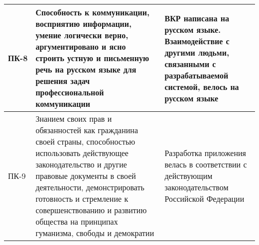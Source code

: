 \documentclass[a4paper,article]{article}
\begin{document}
\begin{sloppypar}
\begin{xltabular}{\textwidth} { |
                >{\hsize} X |
                >{\hsize} X |
                >{\hsize} X | }
            \hline
            ПК-8
            & Способность к коммуникации, восприятию информации, умение логически верно, аргументировано и ясно строить устную и письменную речь на русском языке для решения задач профессиональной коммуникации
            & ВКР написана на русском языке. Взаимодействие с другими людьми, связанными с разрабатываемой системой, велось на русском языке \\
            \hline
            ПК-9
            & Знанием своих прав и обязанностей как гражданина своей страны, способностью использовать действующее законодательство и другие правовые документы в своей деятельности, демонстрировать готовность и стремление к совершенствованию и развитию общества на принципах гуманизма, свободы и демократии
            & Разработка приложения велась в соответствии с действующим законодательством Российской Федерации \\
            \hline
        \end{xltabular}
    \end{sloppypar}
\end{document}

